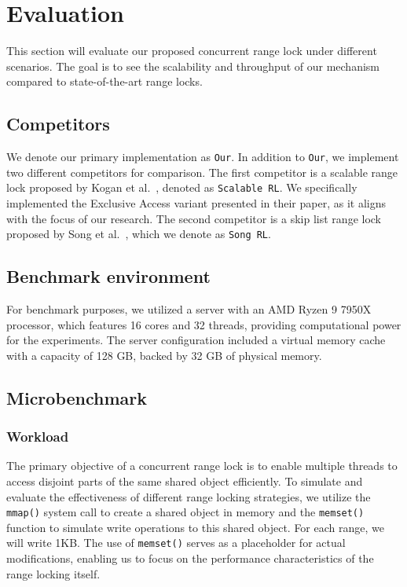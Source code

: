 \chapter{Evaluation}\label{chapter:evaluation}

This section will evaluate our proposed concurrent range lock under different scenarios. 
The goal is to see the scalability and throughput of our mechanism compared to state-of-the-art range locks.

\section{Competitors}

We denote our primary implementation as \texttt{Our}. 
In addition to \texttt{Our}, we implement two different competitors for comparison. 
The first competitor is a scalable range lock proposed by Kogan et al.~\parencite{kogan2020scalable}, denoted as \texttt{Scalable RL}. 
We specifically implemented the Exclusive Access variant presented in their paper, as it aligns with the focus of our research. 
The second competitor is a skip list range lock proposed by Song et al.~\parencite{song2013parallelizing}, which we denote as \texttt{Song RL}.

\section{Benchmark environment}

For benchmark purposes, we utilized a server with an AMD Ryzen 9 7950X processor, which features 16 cores and 32 threads, providing computational power for the experiments. 
The server configuration included a virtual memory cache with a capacity of 128 GB, backed by 32 GB of physical memory. 

\section{Microbenchmark}\label{sec:microbenchmark}

\subsection{Workload}\label{subsec:workload}
The primary objective of a concurrent range lock is to enable multiple threads to access disjoint parts of the same shared object efficiently. 
To simulate and evaluate the effectiveness of different range locking strategies, we utilize the \texttt{mmap()} system call to create a shared object in memory and the \texttt{memset()} function to simulate write operations to this shared object. 
For each range, we will write 1KB. 
The use of \texttt{memset()} serves as a placeholder for actual modifications, enabling us to focus on the performance characteristics of the range locking itself.

